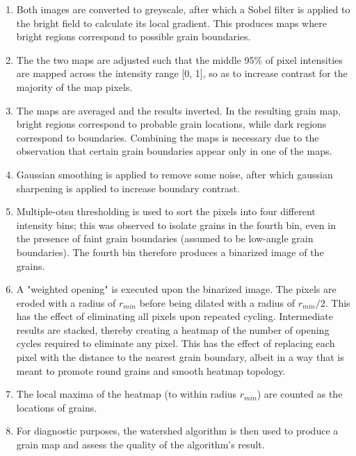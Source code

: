 \begin{enumerate}

	\item Both images are converted to greyscale, after which a Sobel filter is applied to the bright field to calculate its local gradient.  This produces maps where bright regions correspond to possible grain boundaries.

	\item The the two maps are adjusted such that the middle 95\% of pixel intensities are mapped across the intensity range [0, 1], so as to increase contrast for the majority of the map pixels.

	\item The maps are averaged and the results inverted.  In the resulting grain map, bright regions correspond to probable grain locations, while dark regions correspond to boundaries.  Combining the maps is necessary due to the observation that certain grain boundaries appear only in one of the maps.

	\item Gaussian smoothing is applied to remove some noise, after which gaussian sharpening is applied to increase boundary contrast.

	\item Multiple-otsu thresholding is used to sort the pixels into four different intensity bins; this was observed to isolate grains in the fourth bin, even in the presence of faint grain boundaries (assumed to be low-angle grain boundaries).  The fourth bin therefore produces a binarized image of the grains.

	\item A "weighted opening" is executed upon the binarized image.  The pixels are eroded with a radius of $r_{min}$ before being dilated with a radius of $r_{min} / 2$.  This has the effect of eliminating all pixels upon repeated cycling.  Intermediate results are stacked, thereby creating a heatmap of the number of opening cycles required to eliminate any pixel.  This has the effect of replacing each pixel with the distance to the nearest grain boundary, albeit in a way that is meant to promote round grains and smooth heatmap topology.

	\item The local maxima of the heatmap (to within radius $r_{min}$) are counted as the locations of grains.

	\item For diagnostic purposes, the watershed algorithm is then used to produce a grain map and assess the quality of the algorithm's result.

\end{enumerate}

